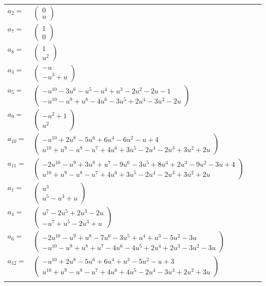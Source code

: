 \documentclass[1p]{elsarticle_modified}
\theoremstyle{definition}
\begin{document}
\begin{tabular}{m{7pt} m{180pt} m{7pt} m{180pt} }
\flushright $a_{2}=$&$\begin{pmatrix}0\\u\end{pmatrix}$ \\
\flushright $a_{7}=$&$\begin{pmatrix}1\\0\end{pmatrix}$ \\
\flushright $a_{8}=$&$\begin{pmatrix}1\\u^2\end{pmatrix}$ \\
\flushright $a_{3}=$&$\begin{pmatrix}- u\\- u^3+u\end{pmatrix}$ \\
\flushright $a_{5}=$&$\begin{pmatrix}- u^{10}-3 u^6- u^5- u^4+u^3-2 u^2-2 u-1\\- u^{10}- u^9+u^8-4 u^6-3 u^5+2 u^4-3 u^2-2 u\end{pmatrix}$ \\
\flushright $a_{9}=$&$\begin{pmatrix}- u^2+1\\u^2\end{pmatrix}$ \\
\flushright $a_{10}=$&$\begin{pmatrix}- u^{10}+2 u^8-5 u^6+6 u^4-6 u^2- u+4\\u^{10}+u^9- u^8- u^7+4 u^6+3 u^5-2 u^4-2 u^3+3 u^2+2 u\end{pmatrix}$ \\
\flushright $a_{11}=$&$\begin{pmatrix}-2 u^{10}- u^9+3 u^8+u^7-9 u^6-3 u^5+8 u^4+2 u^3-9 u^2-3 u+4\\u^{10}+u^9- u^8- u^7+4 u^6+3 u^5-2 u^4-2 u^3+3 u^2+2 u\end{pmatrix}$ \\
\flushright $a_{1}=$&$\begin{pmatrix}u^3\\u^5- u^3+u\end{pmatrix}$ \\
\flushright $a_{4}=$&$\begin{pmatrix}u^7-2 u^5+2 u^3-2 u\\- u^7+u^5-2 u^3+u\end{pmatrix}$ \\
\flushright $a_{6}=$&$\begin{pmatrix}-2 u^{10}- u^9+u^8-7 u^6-3 u^5+u^4+u^3-5 u^2-3 u\\- u^{10}- u^9+u^8+u^7-4 u^6-4 u^5+2 u^4+2 u^3-3 u^2-3 u\end{pmatrix}$ \\
\flushright $a_{12}=$&$\begin{pmatrix}- u^{10}+2 u^8-5 u^6+6 u^4+u^3-5 u^2- u+3\\u^{10}+u^9- u^8- u^7+4 u^6+4 u^5-2 u^4-3 u^3+2 u^2+3 u\end{pmatrix}$\\&\end{tabular}
\end{document}
